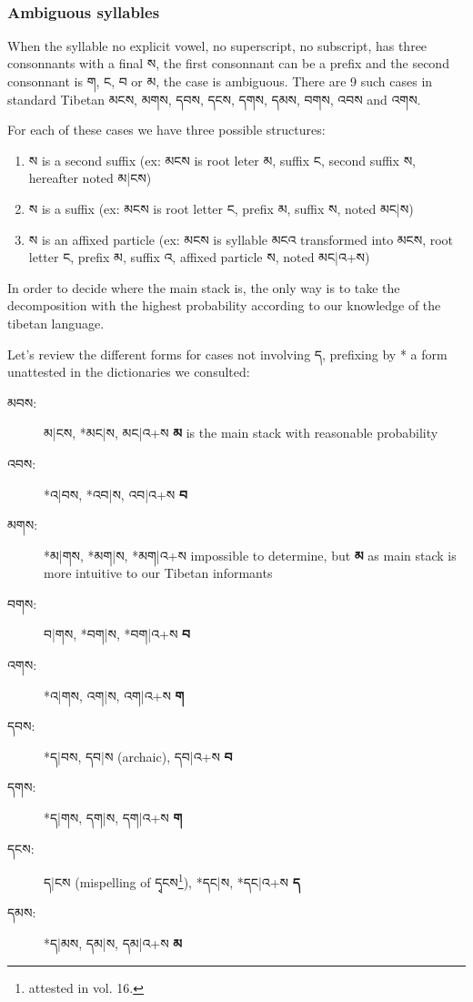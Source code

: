\documentclass[%
a4paper,%
pagesize,%
12pt,%
parskip=off,%
bibliography=totoc,%
numbers=noenddot,%
DIV=12,%
twoside=semi,%
headings=normal%
]{scrartcl}
\begin{document}
­\subsubsection*{Ambiguous syllables}

When the syllable no explicit vowel, no superscript, no subscript, has three consonnants with a final ས, the first consonnant can be a prefix and the second consonnant is ག, ང, བ or མ, the case is ambiguous. There are 9 such cases in standard Tibetan མངས, མགས, དབས, དངས, དགས, དམས, བགས, འབས and འགས.

For each of these cases we have three possible structures:
\begin{enumerate}
\item ས is a second suffix (ex: མངས is root leter མ, suffix ང, second suffix ས, hereafter noted མ|ངས)
\item ས is a suffix (ex: མངས is root letter ང, prefix མ, suffix ས, noted མང|ས)
\item ས is an affixed particle (ex: མངས is syllable མངའ transformed into མངས, root letter ང, prefix མ, suffix འ, affixed particle ས, noted མང|འ+ས)
\end{enumerate}

In order to decide where the main stack is, the only way is to take the decomposition with the highest probability according to our knowledge of the tibetan language.

Let's review the different forms for cases not involving ད, prefixing by * a form unattested in the dictionaries we consulted:

\begin{description}
\item[མབས:] མ|ངས, *མང|ས, མང|འ+ས \rightarrow{} \textbf{མ} is the main stack with reasonable probability
\item[འབས:] *འ|བས, *འབ|ས, འབ|འ+ས \rightarrow{} \textbf{བ}
\item[མགས:] *མ|གས, *མག|ས, *མག|འ+ས \rightarrow{} impossible to determine, but \textbf{མ} as main stack is more intuitive to our Tibetan informants
\item[བགས:] བ|གས, *བག|ས, *བག|འ+ས \rightarrow{} \textbf{བ}
\item[འགས:] *འ|གས, འག|ས, འག|འ+ས \rightarrow{} \textbf{ག}
\item[དབས:] *ད|བས, དབ|ས (archaic), དབ|འ+ས \rightarrow{} \textbf{བ}
\item[དགས:] *ད|གས, དག|ས, དག|འ+ས \rightarrow{} \textbf{ག}
\item[དངས:] ད|ངས (mispelling of དྭངས\footnote{attested in \cite{NegiDict} vol. 16.}), *དང|ས, *དང|འ+ས \rightarrow{} \textbf{ད}%
\item[དམས:] *ད|མས, དམ|ས, དམ|འ+ས \rightarrow{} \textbf{མ}
\end{description}
\end{document}
